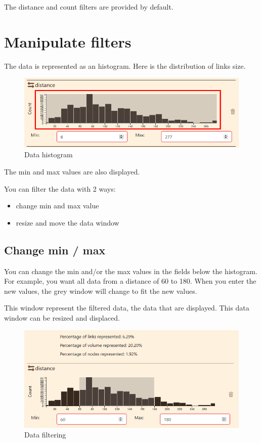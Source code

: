 \documentclass[]{book}
\providecommand{\tightlist}{%
  \setlength{\itemsep}{0pt}\setlength{\parskip}{0pt}}
\begin{document}
The distance and count filters are provided by default.

\hypertarget{manipulate-filters}{%
\section{Manipulate filters}\label{manipulate-filters}}

The data is represented as an histogram.
Here is the distribution of links size.

\begin{figure}
\centering
\includegraphics{images/functions/data_panel/03_data_panel_filter_histogram.png}
\caption{Data histogram}
\end{figure}

The min and max values are also displayed.

You can filter the data with 2 ways:

\begin{itemize}
\tightlist
\item
  change min and max value
\item
  resize and move the data window
\end{itemize}

\hypertarget{change-min-max}{%
\subsection{Change min / max}\label{change-min-max}}

You can change the min and/or the max values in the fields below the histogram.
For example, you want all data from a distance of 60 to 180.
When you enter the new values, the grey window will change to fit the new values.

This window represent the filtered data, the data that are displayed.
This data window can be resized and displaced.

\begin{figure}
\centering
\includegraphics{images/functions/data_panel/04_data_panel_filter_min_max.png}
\caption{Data filtering}
\end{figure}
\end{document}
